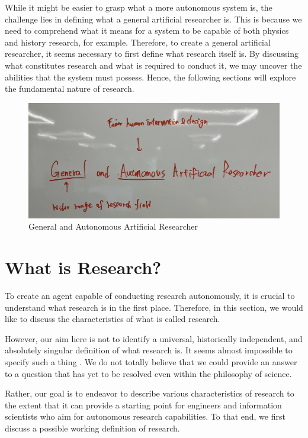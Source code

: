 \documentclass{book}
\begin{document}
While it might be easier to grasp what a more autonomous system is, the challenge lies in defining what a general artificial researcher is. This is because we need to comprehend what it means for a system to be capable of both physics and history research, for example. Therefore, to create a general artificial researcher, it seems necessary to first define what research itself is. By discussing what constitutes research and what is required to conduct it, we may uncover the abilities that the system must possess. Hence, the following sections will explore the fundamental nature of research.

\begin{figure}[htb]
    \centering
    \includegraphics[width=\linewidth]{figs/goal.jpg}
    \caption{General and Autonomous Artificial Researcher}
    \label{fig:goal}
\end{figure}

\section{What is Research?}
To create an agent capable of conducting research autonomously, it is crucial to understand what research is in the first place. Therefore, in this section, we would like to discuss the characteristics of what is called research.

However, our aim here is not to identify a universal, historically independent, and absolutely singular definition of what research is. It seems almost impossible to specify such a thing \cite{chalmers2013thing,sep-scientific-method}. We do not totally believe that we could provide an answer to a question that has yet to be resolved even within the philosophy of science.

Rather, our goal is to endeavor to describe various characteristics of research to the extent that it can provide a starting point for engineers and information scientists who aim for autonomous research capabilities. To that end, we first discuss a possible working definition of research.
\end{document}
